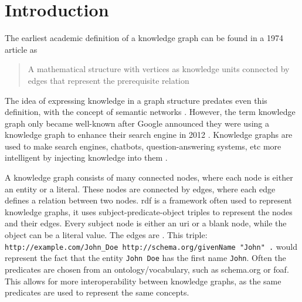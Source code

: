 
\chapter{Introduction}
\label{chapter:introduction}

The earliest academic definition of a knowledge graph can be found in a 1974 article as \begin{quote}
    A mathematical structure with vertices as knowledge units connected by edges that represent the prerequisite relation \citep{Marchi1974,bergman2019common}
\end{quote} 

The idea of expressing knowledge in a graph structure predates even this definition, with the concept of semantic networks \citep{Richens1956PreprogrammingFM}. %
However, the term knowledge graph only became well-known after Google announced they were using a knowledge graph to enhance their search engine in 2012 \citep{singhal2012introducing}. 
Knowledge graphs are used to make search engines, chatbots, question-answering systems, etc more intelligent by injecting knowledge into them \citep{SurveyOnKGs}. 

A knowledge graph consists of many connected nodes, where each node is either an entity or a literal. These nodes are connected by edges, where each edge defines a relation between two nodes. \acrfull{rdf} \citep{rdfprimer} is a framework often used to represent knowledge graphs, it uses subject-predicate-object triples to represent the nodes and their edges. Every subject node is either an \acrshort{uri} or a blank node, while the object can be a literal value. The edges are . This triple: \texttt{http://example.com/John\_Doe http://schema.org/givenName "John" .} would represent the fact that the entity \texttt{John Doe} has the first name \texttt{John}. Often the predicates are chosen from an ontology/vocabulary, such as schema.org or \acrshort{foaf}. This allows for more interoperability between knowledge graphs, as the same predicates are used to represent the same concepts.

